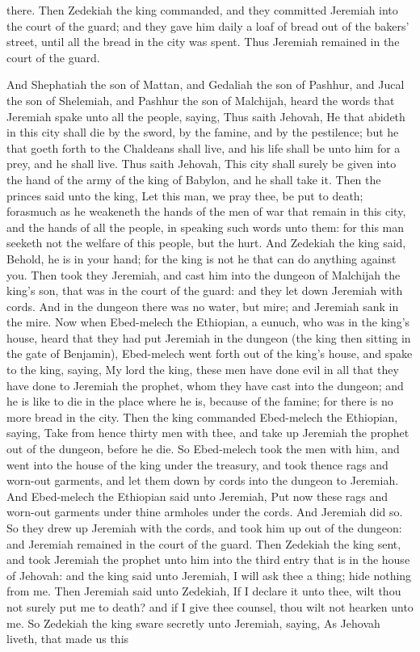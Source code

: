 there. Then Zedekiah the king commanded, and they committed Jeremiah into the court of the guard; and they gave him daily a loaf of bread out of the bakers’ street, until all the bread in the city was spent. Thus Jeremiah remained in the court of the guard. 

And Shephatiah the son of Mattan, and Gedaliah the son of Pashhur, and Jucal the son of Shelemiah, and Pashhur the son of Malchijah, heard the words that Jeremiah spake unto all the people, saying, Thus saith Jehovah, He that abideth in this city shall die by the sword, by the famine, and by the pestilence; but he that goeth forth to the Chaldeans shall live, and his life shall be unto him for a prey, and he shall live. Thus saith Jehovah, This city shall surely be given into the hand of the army of the king of Babylon, and he shall take it. Then the princes said unto the king, Let this man, we pray thee, be put to death; forasmuch as he weakeneth the hands of the men of war that remain in this city, and the hands of all the people, in speaking such words unto them: for this man seeketh not the welfare of this people, but the hurt. And Zedekiah the king said, Behold, he is in your hand; for the king is not he that can do anything against you. Then took they Jeremiah, and cast him into the dungeon of Malchijah the king’s son, that was in the court of the guard: and they let down Jeremiah with cords. And in the dungeon there was no water, but mire; and Jeremiah sank in the mire.  Now when Ebed-melech the Ethiopian, a eunuch, who was in the king’s house, heard that they had put Jeremiah in the dungeon (the king then sitting in the gate of Benjamin), Ebed-melech went forth out of the king’s house, and spake to the king, saying, My lord the king, these men have done evil in all that they have done to Jeremiah the prophet, whom they have cast into the dungeon; and he is like to die in the place where he is, because of the famine; for there is no more bread in the city. Then the king commanded Ebed-melech the Ethiopian, saying, Take from hence thirty men with thee, and take up Jeremiah the prophet out of the dungeon, before he die. So Ebed-melech took the men with him, and went into the house of the king under the treasury, and took thence rags and worn-out garments, and let them down by cords into the dungeon to Jeremiah. And Ebed-melech the Ethiopian said unto Jeremiah, Put now these rags and worn-out garments under thine armholes under the cords. And Jeremiah did so. So they drew up Jeremiah with the cords, and took him up out of the dungeon: and Jeremiah remained in the court of the guard.  Then Zedekiah the king sent, and took Jeremiah the prophet unto him into the third entry that is in the house of Jehovah: and the king said unto Jeremiah, I will ask thee a thing; hide nothing from me. Then Jeremiah said unto Zedekiah, If I declare it unto thee, wilt thou not surely put me to death? and if I give thee counsel, thou wilt not hearken unto me. So Zedekiah the king sware secretly unto Jeremiah, saying, As Jehovah liveth, that made us this 